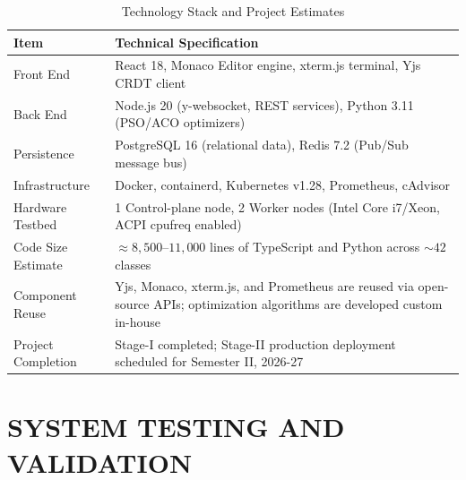 \documentclass[12pt,a4paper]{report}
\begin{document}
	\begin{table}[H]
		\centering
		\caption{Technology Stack and Project Estimates}
		\label{tab:stack}
		\begin{tabularx}{\linewidth}{@{}p{3.5cm}X@{}}
			\toprule
			\textbf{Item} & \textbf{Technical Specification} \\ \midrule
			Front End & React 18, Monaco Editor engine, xterm.js terminal, Yjs CRDT client \\
			Back End & Node.js 20 (y-websocket, REST services), Python 3.11 (PSO/ACO optimizers) \\
			Persistence & PostgreSQL 16 (relational data), Redis 7.2 (Pub/Sub message bus) \\
			Infrastructure & Docker, containerd, Kubernetes v1.28, Prometheus, cAdvisor \\
			Hardware Testbed & 1 Control-plane node, 2 Worker nodes (Intel Core i7/Xeon, ACPI cpufreq enabled) \\
			Code Size Estimate & $\approx 8,500$--$11,000$ lines of TypeScript and Python across $\sim 42$ classes \\
			Component Reuse & Yjs, Monaco, xterm.js, and Prometheus are reused via open-source APIs; optimization algorithms are developed custom in-house \\
			Project Completion & Stage-I completed; Stage-II production deployment scheduled for Semester II, 2026-27 \\ \bottomrule
		\end{tabularx}
	\end{table}
	
	\chapter{SYSTEM TESTING AND VALIDATION}
	
\end{document}
